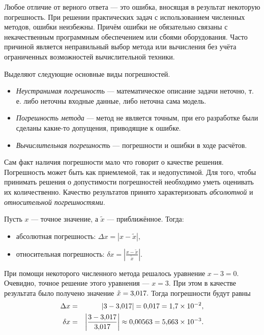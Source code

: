 

\Theory


Любое отличие от верного ответа — это ошибка, вносящая в результат
некоторую погрешность. При решении практических задач с использованием
численных методов, ошибки неизбежны. Причём ошибки не обязательно
связаны с некачественным программным обеспечением или сбоями
оборудования.  Часто причиной является неправильный выбор метода или
вычисления без учёта ограниченных возможностей вычислительной техники.

Выделяют следующие основные виды погрешностей.
\begin{itemize}
\item \emph{Неустранимая погрешность} — математическое описание задачи
  неточно, т. е. либо неточны входные данные, либо неточна сама
  модель.
\item \emph{Погрешность метода} — метод не является точным, при его
  разработке были сделаны какие-то допущения, приводящие к ошибке.
\item \emph{Вычислительная погрешность} — погрешности и ошибки в ходе
  расчётов.
\end{itemize}


Сам факт наличия погрешности мало что говорит о качестве решения.
Погрешность может быть как приемлемой, так и недопустимой. Для того,
чтобы принимать решения о допустимости погрешностей необходимо уметь
оценивать их количественно. Качество результатов принято
характеризовать \emph{абсолютной} и \emph{относительной
  погрешностями}.

Пусть $x$ — точное значение, а $\tilde{x}$ — приближённое. Тогда:
\begin{itemize}
\item абсолютная погрешность: $\Delta x=|x-\tilde{x}|,$
\item относительная погрешность: $\delta
  x=\left|\frac{x-\tilde{x}}{\tilde{x}}\right|.$\end{itemize}
\begin{example}
  При помощи некоторого численного метода решалось уравнение $x-3=0.$
  Очевидно, точное решение этого уравнения — $x=3.$ При этом в качестве
  результата было получено значение $\tilde{x}=3{,}017.$ Тогда
  погрешности будут равны
  \begin{eqnarray*}
    \Delta x & = & |3-3{,}017|=0{,}017=1{,}7\times10^{-2},\\ \delta x & = &
    \left|\frac{3-3{,}017}{3{,}017}\right|\approx0{,}00563=5{,}663\times10^{-3}.
  \end{eqnarray*}
\end{example}
\smallskip{}

